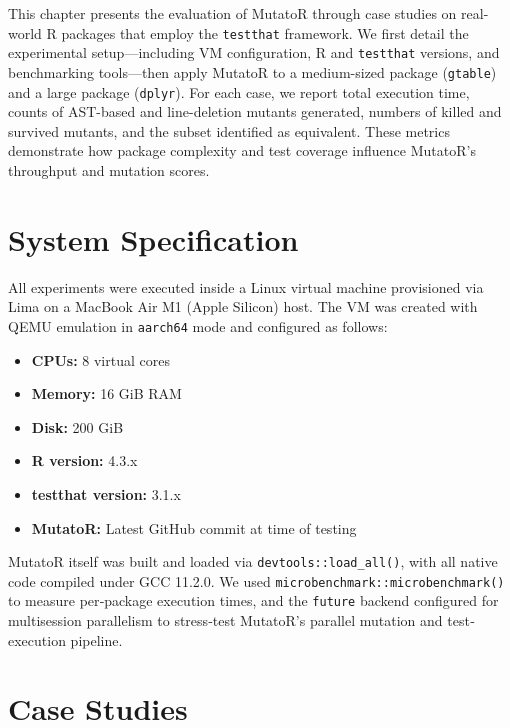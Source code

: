 
\begin{chapterabstract}
This chapter presents the evaluation of MutatoR through case studies on real-world R packages that employ the \texttt{testthat} framework. We first detail the experimental setup—including VM configuration, R and \texttt{testthat} versions, and benchmarking tools—then apply MutatoR to a medium-sized package (\texttt{gtable}) and a large package (\texttt{dplyr}). For each case, we report total execution time, counts of AST-based and line-deletion mutants generated, numbers of killed and survived mutants, and the subset identified as equivalent. These metrics demonstrate how package complexity and test coverage influence MutatoR’s throughput and mutation scores.

\end{chapterabstract}

\section{System Specification}

All experiments were executed inside a Linux virtual machine provisioned via Lima on a MacBook Air M1 (Apple Silicon) host.  The VM was created with QEMU emulation in \texttt{aarch64} mode and configured as follows:

\begin{itemize}
  \item \textbf{CPUs:} 8 virtual cores  
  \item \textbf{Memory:} 16 GiB RAM  
  \item \textbf{Disk:} 200 GiB  
  \item \textbf{R version:} 4.3.x  
  \item \textbf{testthat version:} 3.1.x \cite{wickham2011testthat}  
  \item \textbf{MutatoR:} Latest GitHub commit at time of testing  
\end{itemize}

MutatoR itself was built and loaded via \texttt{devtools::load\_all()}, with all native code compiled under GCC 11.2.0.  We used \texttt{microbenchmark::microbenchmark()} to measure per‐package execution times, and the \texttt{future} backend configured for multisession parallelism to stress‐test MutatoR’s parallel mutation and test‐execution pipeline.

\section{Case Studies}

